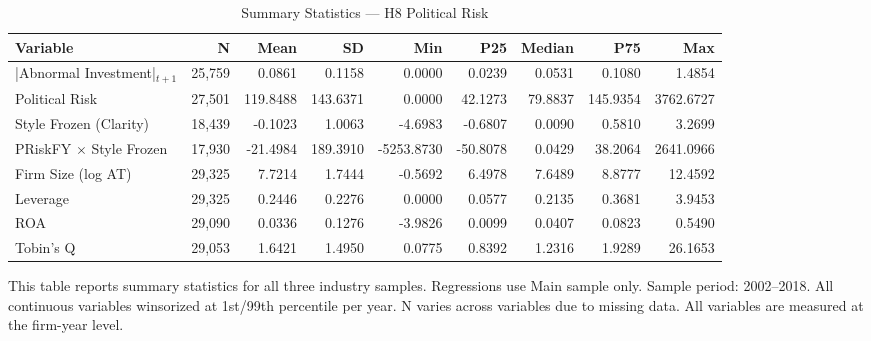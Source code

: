 \begin{table}[htbp]
\centering
\caption{Summary Statistics — H8 Political Risk}
\label{tab:summary_stats_h8}
\begin{tabular}{lrrrrrrrr}
\toprule
Variable & N & Mean & SD & Min & P25 & Median & P75 & Max \\
\midrule
|Abnormal Investment|$_{t+1}$ & 25,759 & 0.0861 & 0.1158 & 0.0000 & 0.0239 & 0.0531 & 0.1080 & 1.4854 \\
Political Risk & 27,501 & 119.8488 & 143.6371 & 0.0000 & 42.1273 & 79.8837 & 145.9354 & 3762.6727 \\
Style Frozen (Clarity) & 18,439 & -0.1023 & 1.0063 & -4.6983 & -0.6807 & 0.0090 & 0.5810 & 3.2699 \\
PRiskFY $\times$ Style Frozen & 17,930 & -21.4984 & 189.3910 & -5253.8730 & -50.8078 & 0.0429 & 38.2064 & 2641.0966 \\
Firm Size (log AT) & 29,325 & 7.7214 & 1.7444 & -0.5692 & 6.4978 & 7.6489 & 8.8777 & 12.4592 \\
Leverage & 29,325 & 0.2446 & 0.2276 & 0.0000 & 0.0577 & 0.2135 & 0.3681 & 3.9453 \\
ROA & 29,090 & 0.0336 & 0.1276 & -3.9826 & 0.0099 & 0.0407 & 0.0823 & 0.5490 \\
Tobin's Q & 29,053 & 1.6421 & 1.4950 & 0.0775 & 0.8392 & 1.2316 & 1.9289 & 26.1653 \\
\bottomrule
\end{tabular}
\begin{tablenotes}
\small
\item This table reports summary statistics for all three industry samples. Regressions use Main sample only. Sample period: 2002--2018. All continuous variables winsorized at 1st/99th percentile per year. N varies across variables due to missing data.
All variables are measured at the firm-year level.
\end{tablenotes}
\end{table}